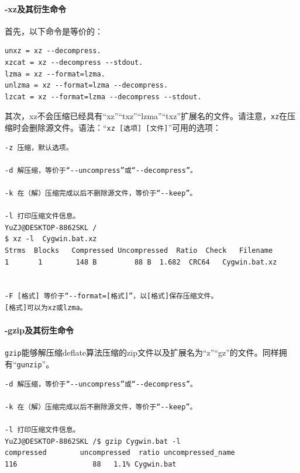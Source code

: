 \paragraph{-xz及其衍生命令}
首先，以下命令是等价的：\par
\begin{verbatim}
unxz = xz --decompress.
xzcat = xz --decompress --stdout.
lzma = xz --format=lzma.
unlzma = xz --format=lzma --decompress.
lzcat = xz --format=lzma --decompress --stdout.
\end{verbatim}\par
其次，xz不会压缩已经具有“xz”“txz”“lzma”“txz”扩展名的文件。请注意，\verb|xz|在压缩时会删除源文件。语法：“\verb|xz [选项] [文件]|”可用的选项：\par
\begin{verbatim}
-z 压缩，默认选项。

-d 解压缩，等价于“--uncompress”或“--decompress”。

-k 在（解）压缩完成以后不删除源文件，等价于“--keep”。

-l 打印压缩文件信息。
YuZJ@DESKTOP-8862SKL /
$ xz -l  Cygwin.bat.xz
Strms  Blocks   Compressed Uncompressed  Ratio  Check   Filename
1       1        148 B         88 B  1.682  CRC64   Cygwin.bat.xz


-F [格式] 等价于“--format=[格式]”，以[格式]保存压缩文件。
[格式]可以为xz或lzma。
\end{verbatim}
\paragraph{-gzip及其衍生命令}
\verb|gzip|能够解压缩deflate算法压缩的zip文件以及扩展名为“z”“gz”的文件。同样拥有“\verb|gunzip|”。\par
\begin{verbatim}
-d 解压缩，等价于“--uncompress”或“--decompress”。

-k 在（解）压缩完成以后不删除源文件，等价于“--keep”。

-l 打印压缩文件信息。
YuZJ@DESKTOP-8862SKL /$ gzip Cygwin.bat -l
compressed        uncompressed  ratio uncompressed_name
116                  88   1.1% Cygwin.bat

\end{verbatim}
